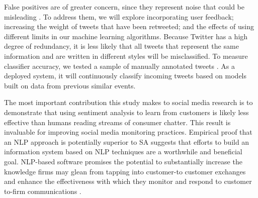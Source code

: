 \documentclass[journal]{IEEEtran}
\begin{document}
False positives are of greater concern, since they represent noise that could be misleading \cite{nlp2}. To address them, we will explore incorporating user feedback; increasing the weight of tweets that have been retweeted; and the effects of using different limits in our machine learning algorithms. Because Twitter has a high degree of redundancy, it is less likely that all tweets that represent the same information and are written in different styles will be misclassified. To measure classifier accuracy, we tested a sample of manually annotated tweets \cite{nlp2}. As a deployed system, it will continuously classify incoming tweets based on models built on data from previous similar events. 

The most important contribution this study makes to social media research is to demonstrate that using sentiment analysis to learn from customers is likely less effective than humans reading streams of consumer chatter. This result \cite{traff} is invaluable for improving social media monitoring practices. Empirical proof that an NLP approach is potentially superior to SA suggests that efforts to build an information system based on NLP techniques are a worthwhile and beneficial goal. NLP-based software promises the potential to substantially increase the knowledge firms may glean from tapping into customer-to customer exchanges and enhance the effectiveness with which they monitor and respond to customer to-firm communications \cite{traff}.
\end{document}
